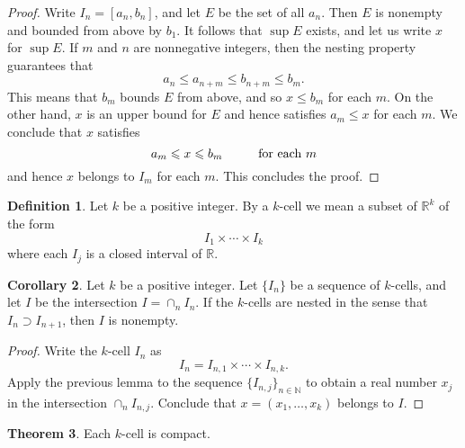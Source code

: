 \documentclass[12pt]{article}
\theoremstyle{definition}
\newtheorem{definition}{Definition}
\theoremstyle{theorem}
\newtheorem{theorem}[definition]{Theorem}
\newtheorem{corollary}[definition]{Corollary}
\begin{document}
\begin{proof}
Write $I_n = [a_n, b_n]$, and let $E$ be the set of all $a_n$. Then $E$ is nonempty and bounded from above by $b_1$. It follows that $\sup E$ exists, and let us write $x$ for $\sup E$. If $m$ and $n$ are nonnegative integers, then the nesting property guarantees that 
\[
a_n \leqslant a_{n+m} \leqslant b_{n+m} \leqslant b_m.
\]
This means that $b_m$ bounds $E$ from above, and so $x \leqslant b_m$ for each $m$. On the other hand, $x$ is an upper bound for $E$ and hence satisfies $a_m \leqslant x$ for each $m$. We conclude that $x$ satisfies 
\[
a_m \leqslant x \leqslant b_m \hspace{10mm} \text{for each $m$}
\]
and hence $x$ belongs to $I_m$ for each $m$. This concludes the proof. 
\end{proof}

\begin{definition}
Let $k$ be a positive integer. By a $k$-cell we mean a subset of $\mathbb{R}^k$ of the form 
\[
I_1 \times \cdots \times I_k
\]
where each $I_j$ is a closed interval of $\mathbb{R}$. 
\end{definition}

\begin{corollary}
Let $k$ be a positive integer. Let $\{I_n\}$ be a sequence of $k$-cells, and let $I$ be the intersection $I = \cap_n I_n$. If the $k$-cells are nested in the sense that $I_n \supset I_{n+1}$, then $I$ is nonempty. 
\end{corollary}

\begin{proof}
Write the $k$-cell $I_n$ as 
\[
I_n = I_{n,1} \times \cdots \times I_{n,k}.
\]
Apply the previous lemma to the sequence $\{I_{n,j}\}_{n \in \mathbb{N}}$ to obtain a real number $x_j$ in the intersection $\cap_n I_{n,j}$. Conclude that $x = (x_1, \ldots, x_k)$ belongs to $I$. 
\end{proof}

\begin{theorem}
Each $k$-cell is compact. 
\end{theorem}
\end{document}
